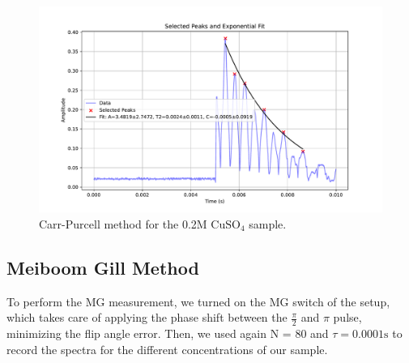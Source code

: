 \documentclass[12pt]{article}
\begin{document}
\begin{figure}[H]
  \includegraphics[scale = 0.5]{CP_0.2.pdf}
  \caption{Carr-Purcell method for the 0.2M $\text{CuSO}_4$ sample.}
  \label{CP_0.2.pdf}
\end{figure}





\subsection{Meiboom Gill Method}
To perform the MG measurement, we turned on the MG switch of the setup, which takes care of applying the phase shift between the $\frac{\pi}{2}$ and $\pi$ pulse, minimizing the flip angle error. Then, we used again N = 80 and $\tau = 0.0001 \text{s}$ to record the spectra for the different concentrations of our sample.
\end{document}
